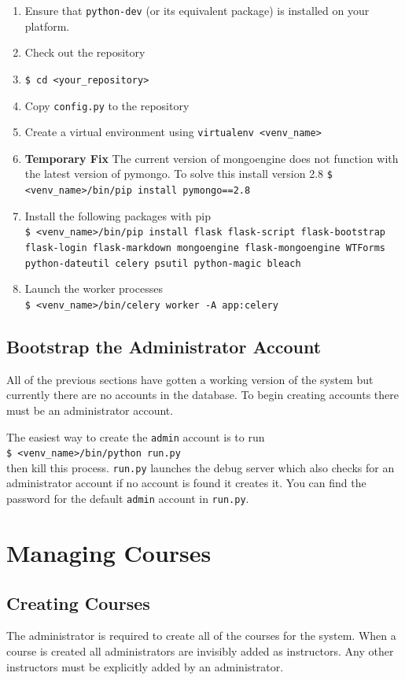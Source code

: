 \documentclass[11pt]{report}
\begin{document}
\begin{enumerate}
\item Ensure that \verb|python-dev| (or its equivalent package) is installed on your platform.
\item Check out the repository
\item \verb|$ cd <your_repository>|
\item Copy \texttt{config.py} to the repository
\item Create a virtual environment using \verb|virtualenv <venv_name>|
\item \textbf{Temporary Fix} The current version of mongoengine does not function with the latest version
of pymongo. To solve this install version 2.8 \verb|$ <venv_name>/bin/pip install pymongo==2.8|
\item Install the following packages with pip\\
\texttt{\$ <venv\_name>/bin/pip install flask flask-script flask-bootstrap flask-login flask-markdown mongoengine flask-mongoengine WTForms python-dateutil celery psutil python-magic bleach}
\item Launch the worker processes\\
\verb|$ <venv_name>/bin/celery worker -A app:celery|
\end{enumerate}

\subsection{Bootstrap the Administrator Account}
All of the previous sections have gotten a working version of the system but currently there are no accounts
in the database. To begin creating accounts there must be an administrator account. 

The easiest way to create the \texttt{admin} account is to run\\
\verb|$ <venv_name>/bin/python run.py|\\
then kill this process. \texttt{run.py} launches the debug server which also checks for an administrator account
if no account is found it creates it. You can find the password for the default \texttt{admin} account in
\texttt{run.py}.





\section{Managing Courses}
\subsection{Creating Courses}
The administrator is required to create all of the courses for the system. When a course is created all administrators are invisibly added as instructors. Any other instructors must be explicitly added by an 
administrator. 
\end{document}

